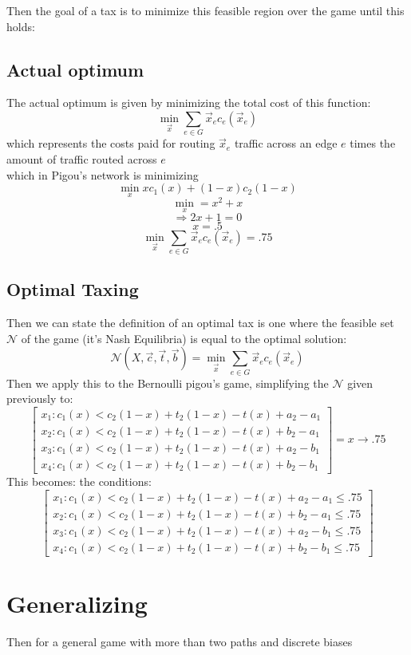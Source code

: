 \documentclass[12pt]{article}
\begin{document}
 Then the goal of a tax is to minimize this feasible region over the game until this holds:
 \subsection{Actual optimum}
 The actual optimum is given by minimizing the total cost of this function: \[\min_{\vec x} \sum_{e \in G} \vec x_e c_e(\vec x_e)\] which represents the costs paid for routing $\vec x_e$ traffic across an edge $e$ times the amount of traffic routed across $e$\\ which in Pigou's network is minimizing \[\min_x x c_1(x) + (1-x)c_2(1-x)\]
 \[\min_x = x^2 + x\]
 \[\Rightarrow 2x +1 =0\]
 \[x = .5\]
 \[ \min_{\vec x} \sum_{e \in G} \vec x_e c_e(\vec x_e) = .75 \] 
 
 \subsection{Optimal Taxing}
Then we can state the definition of an optimal tax is one where
the feasible set $\mathcal N$ of the game (it's Nash Equilibria)  is equal to the optimal solution:
\[ \mathcal N(X, \vec c, \vec t, \vec b) = \min_{\vec x} \sum_{e \in G}  \vec x_e c_e(\vec x_e) \]
Then we apply this to the Bernoulli pigou's game, simplifying the $\mathcal N$ given previously to:
 \[\left[\begin{array} {c} x_1: c_1(x)    < c_2(1-x)+t_2(1-x)-t(x)+a_2 -a_1 \\ 
 x_2: c_1(x) < c_2(1-x)+t_2(1-x)-t(x)+b_2 -a_1  \\
  x_3: c_1(x)  < c_2(1-x)+t_2(1-x)-t(x)+a_2-b_1  \\
   x_4: c_1(x)  < c_2(1-x)+t_2(1-x)-t(x)+b_2 -b_1 \end{array} \right]  =  x \rightarrow .75 \]
   This becomes: the conditions:
\[\left[\begin{array} {c}
    x_1: c_1(x)    < c_2(1-x)+t_2(1-x)-t(x)+a_2 -a_1 \leq .75 \\ 
 x_2: c_1(x) < c_2(1-x)+t_2(1-x)-t(x)+b_2 -a_1 \leq .75  \\
  x_3: c_1(x)  < c_2(1-x)+t_2(1-x)-t(x)+a_2-b_1 \leq .75 \\
   x_4: c_1(x)  < c_2(1-x)+t_2(1-x)-t(x)+b_2 -b_1 \leq .75 \end{array} \right]
   \] 
 \section{Generalizing}
 Then for a general game with more than two paths and discrete biases 
 
\end{document}
